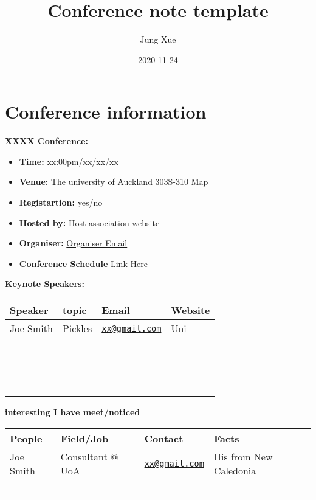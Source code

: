 \documentclass[
]{book}
\title{Conference note template}
\author{Jung Xue}
\date{2020-11-24}
\providecommand{\tightlist}{%
  \setlength{\itemsep}{0pt}\setlength{\parskip}{0pt}}
\begin{document}
\maketitle

{
\setcounter{tocdepth}{1}
\tableofcontents
}
\hypertarget{conference-information}{%
\chapter*{Conference information}\label{conference-information}}

\textbf{XXXX Conference:}

\begin{itemize}
\tightlist
\item
  \textbf{Time:} xx:00pm/xx/xx/xx
\item
  \textbf{Venue:} The university of Auckland 303S-310 \href{}{Map}
\item
  \textbf{Registartion:} yes/no
\item
  \textbf{Hosted by:} \href{}{Host association website}
\item
  \textbf{Organiser:} \href{}{Organiser Email}
\item
  \textbf{Conference Schedule} \href{}{Link Here}
\end{itemize}

\textbf{Keynote Speakers:}

\begin{longtable}[]{@{}llll@{}}
\toprule
Speaker & topic & Email & Website\tabularnewline
\midrule
\endhead
Joe Smith & Pickles & \href{mailto:xx@gmail.com}{\nolinkurl{xx@gmail.com}} & \href{www.google.com}{Uni}\tabularnewline
& & &\tabularnewline
& & &\tabularnewline
& & &\tabularnewline
& & &\tabularnewline
& & &\tabularnewline
& & &\tabularnewline
& & &\tabularnewline
& & &\tabularnewline
& & &\tabularnewline
& & &\tabularnewline
& & &\tabularnewline
& & &\tabularnewline
& & &\tabularnewline
& & &\tabularnewline
& & &\tabularnewline
& & &\tabularnewline
\bottomrule
\end{longtable}

\textbf{interesting I have meet/noticed}

\begin{longtable}[]{@{}llll@{}}
\toprule
People & Field/Job & Contact & Facts\tabularnewline
\midrule
\endhead
Joe Smith & Consultant @ UoA & \href{mailto:xx@gmail.com}{\nolinkurl{xx@gmail.com}} & His from New Caledonia\tabularnewline
& & &\tabularnewline
& & &\tabularnewline
& & &\tabularnewline
& & &\tabularnewline
\bottomrule
\end{longtable}
\end{document}
